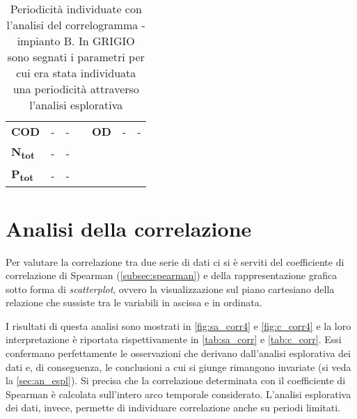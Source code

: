 \begin{table}
\begin{center}
\begin{tabular}{l|c|c|llcc}
		\multicolumn{1}{|l|}{\textbf{COD}}       & -                                                                        & -                                                                          & \multicolumn{1}{l|}{} & \multicolumn{1}{l|}{\textbf{OD}}      & \multicolumn{1}{c|}{-}                                                                       & \multicolumn{1}{c|}{-}                                                                          \\ \cline{1-3} \cline{5-7} 
		\multicolumn{1}{|l|}{\textbf{N\textsubscript{tot}}}      & -                                                                        & -                                                                          &                       & \textbf{}                             &                                                                                              &                                                                                                 \\ \cline{1-3}
		\multicolumn{1}{|l|}{\textbf{P\textsubscript{tot}}}      & -                                                                        & -                                                                          &                       & \textbf{}                             &                                                                                              &                                                                                                 \\ \cline{1-3}
	\end{tabular}
\caption{Periodicità individuate con l'analisi del correlogramma - impianto B. In GRIGIO sono segnati i parametri per cui era stata individuata una periodicità attraverso l'analisi esplorativa}
\label{tab:c_stagionalita}
\end{center}
\end{table}

\section{Analisi della correlazione}
Per valutare la correlazione tra due serie di dati ci si è serviti del coefficiente di correlazione di Spearman (\autoref{subsec:spearman}) e della rappresentazione grafica sotto forma di \textit{scatterplot}, ovvero la visualizzazione sul piano cartesiano della relazione che sussiste tra le variabili in ascissa e in ordinata.

I risultati di questa analisi sono mostrati in \autoref{fig:sa_corr4} e \autoref{fig:c_corr4} e la loro interpretazione è riportata rispettivamente in \autoref{tab:sa_corr} e \autoref{tab:c_corr}. Essi confermano perfettamente le osservazioni che derivano dall'analisi esplorativa dei dati e, di conseguenza, le conclusioni a cui si giunge rimangono invariate (si veda la \autoref{sec:an_espl}). Si precisa che la correlazione determinata con il coefficiente di Spearman è calcolata sull'intero arco temporale considerato. L'analisi esplorativa dei dati, invece, permette di individuare correlazione anche su periodi limitati. 


